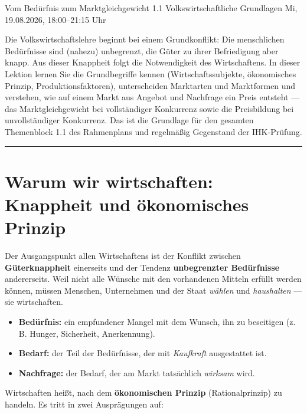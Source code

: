 \documentclass[11pt, a4paper]{article}
\begin{document}
%
  {Vom Bedürfnis zum Marktgleichgewicht}%
  {1.1 Volkswirtschaftliche Grundlagen}%
  {Mi, 19.08.2026, 18:00--21:15 Uhr}

\begin{merksatz}[title={\bfseries Worum geht es in dieser Lektion?}]
Die Volkswirtschaftslehre beginnt bei einem Grundkonflikt: Die menschlichen Bedürfnisse
sind (nahezu) unbegrenzt, die Güter zu ihrer Befriedigung aber knapp. Aus dieser Knappheit
folgt die Notwendigkeit des Wirtschaftens. In dieser Lektion lernen Sie die Grundbegriffe
kennen (Wirtschaftssubjekte, ökonomisches Prinzip, Produktionsfaktoren), unterscheiden
Marktarten und Marktformen und verstehen, wie auf einem Markt aus Angebot und Nachfrage
ein Preis entsteht --- das Marktgleichgewicht bei vollständiger Konkurrenz sowie die
Preisbildung bei unvollständiger Konkurrenz. Das ist die Grundlage für den gesamten
Themenblock 1.1 des Rahmenplans und regelmäßig Gegenstand der IHK-Prüfung.
\end{merksatz}

\tableofcontents
\vspace{1em}
\hrule
\vspace{1em}

\section{Warum wir wirtschaften: Knappheit und ökonomisches Prinzip}

Der Ausgangspunkt allen Wirtschaftens ist der Konflikt zwischen \textbf{Güterknappheit}
einerseits und der Tendenz \textbf{unbegrenzter Bedürfnisse} andererseits. Weil nicht alle
Wünsche mit den vorhandenen Mitteln erfüllt werden können, müssen Menschen, Unternehmen
und der Staat \emph{wählen} und \emph{haushalten} --- sie wirtschaften.

\begin{itemize}
  \item \textbf{Bedürfnis:} ein empfundener Mangel mit dem Wunsch, ihn zu beseitigen
    (z.\,B. Hunger, Sicherheit, Anerkennung).
  \item \textbf{Bedarf:} der Teil der Bedürfnisse, der mit \emph{Kaufkraft} ausgestattet ist.
  \item \textbf{Nachfrage:} der Bedarf, der am Markt tatsächlich \emph{wirksam} wird.
\end{itemize}

Wirtschaften heißt, nach dem \textbf{ökonomischen Prinzip} (Rationalprinzip) zu handeln.
Es tritt in zwei Ausprägungen auf:
\end{document}
